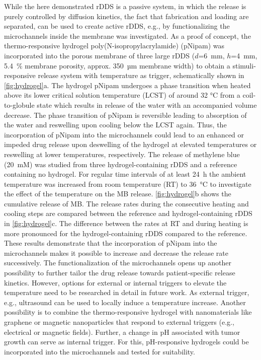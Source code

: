 While the here demonstrated rDDS is a passive system, in which the release is purely controlled by diffusion kinetics, the fact that fabrication and loading are separated, can be used to create active rDDS, e.g., by functionalizing the microchannels inside the membrane was investigated. As a proof of concept, the thermo-responsive hydrogel poly(N-isopropylacrylamide) (pNipam) was incorporated into the porous membrane of three large rDDS ($d$=6~mm, $h$=4~mm, 5.4~\% membrane porosity, approx. 350~µm membrane width) to obtain a stimuli-responsive release system with temperature as trigger, schematically shown in \cref{fig:hydrogel}a. The hydrogel pNipam undergoes a phase transition when heated above its lower critical solution temperature (LCST) of around 32 °C from a coil-to-globule state which results in release of the water with an accompanied volume decrease\supercite{podewitz2019coil,ilmain1991volume,heskins1968solution}. The phase transition of pNipam is reversible leading to absorption of the water and reswelling upon cooling below the LCST again. Thus, the incorporation of pNipam into the microchannels could lead to an enhanced or impeded drug release upon deswelling of the hydrogel at elevated temperatures or reswelling at lower temperatures, respectively. The release of methylene blue (20~mM) was studied from three hydrogel-containing rDDS and a reference containing no hydrogel. For regular time intervals of at least 24~h the ambient temperature was increased from room temperature (RT) to 36~°C to investigate the effect of the temperature on the MB release. \cref{fig:hydrogel}b shows the cumulative release of MB. The release rates during the consecutive heating and cooling steps are compared between the reference and hydrogel-containing rDDS in \cref{fig:hydrogel}c. The difference between the rates at RT and during heating is more pronounced for the hydrogel-containing rDDS compared to the reference. These results demonstrate that the incorporation of pNipam into the microchannels makes it possible to increase and decrease the release rate successively. The functionalization of the microchannels opens up another possibility to further tailor the drug release towards patient-specific release kinetics. However, options for external or internal triggers to elevate the temperature need to be researched in detail in future work. As external trigger, e.g., ultrasound can be used to locally induce a temperature increase\supercite{timko2010remotely}. Another possibility is to combine the thermo-responsive hydrogel with nanomaterials like graphene or magnetic nanoparticles that respond to external triggers (e.g., electrical or magnetic fields)\supercite{gu2019graphene}. Further, a change in pH associated with tumor growth can serve as internal trigger. For this, pH-responsive hydrogels could be incorporated into the microchannels and tested for suitability\supercite{andrade2021stimuli}. 

